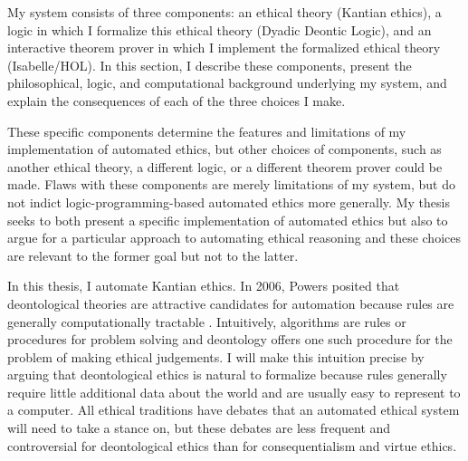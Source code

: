 %
\begin{isabellebody}%
%
%
\isadelimtheory
%
\endisadelimtheory
%
\isatagtheory
%
\endisatagtheory
{\isafoldtheory}%
%
\isadelimtheory
%
\endisadelimtheory
%
\isadelimdocument
%
\endisadelimdocument
%
\isatagdocument
%
\isamarkuptrue%
%
\endisatagdocument
{\isafolddocument}%
%
\isadelimdocument
%
\endisadelimdocument
%
\begin{isamarkuptext}%
My system consists of three components: an ethical theory (Kantian ethics), a logic in which
I formalize this ethical theory (Dyadic Deontic Logic), and an interactive theorem prover in which I 
implement the formalized ethical theory (Isabelle/HOL). In this section, I describe these components, 
present the philosophical, logic, and computational background underlying my system, and explain
the consequences of each of the three choices I make. 

These specific components determine the features
and limitations of my implementation of automated ethics, but other choices of 
components, such as another ethical theory, a different logic, or a different theorem prover could be 
made. Flaws with these components are merely limitations of my system, but do not 
indict logic-programming-based automated ethics more generally. My thesis seeks to 
both present a specific implementation of automated ethics but also to argue for a particular approach 
to automating ethical reasoning and these choices are relevant to the former goal but not to the latter.%
\end{isamarkuptext}\isamarkuptrue%
%
\isadelimdocument
%
\endisadelimdocument
%
\isatagdocument
%
\isamarkuptrue%
%
\endisatagdocument
{\isafolddocument}%
%
\isadelimdocument
%
\endisadelimdocument
%
\begin{isamarkuptext}%
In this thesis, I automate Kantian ethics. In 2006, Powers posited that deontological theories are 
attractive candidates for automation because rules are generally computationally tractable \cite[1]{powers}. 
Intuitively, algorithms are rules or procedures for problem solving and deontology offers one such 
procedure for the problem of making ethical judgements. I will make this intuition precise by
arguing that deontological ethics is natural to formalize because rules generally require little additional
data about the world and are usually easy to represent to a computer. All ethical traditions have debates that an 
automated ethical system will need to take a stance on, but these debates are less frequent and controversial
for deontological ethics than for consequentialism and virtue ethics.


\end{isamarkuptext}
\end{isabellebody}
